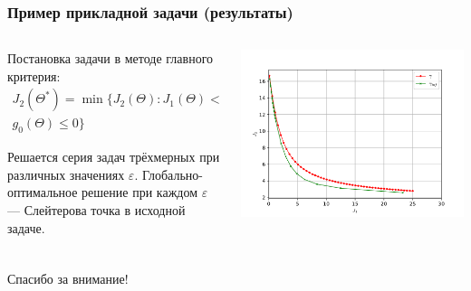 \documentclass[aspectratio=1610]{beamer}
\begin{document}
\begin{frame}
  \frametitle{Пример прикладной задачи (результаты)}
  \begin{columns}
    \begin{column}{0.4\textwidth}

      Постановка задачи в методе главного критерия:
      \begin{align*}
        J_2(\Theta^*)=\min\{J_2(\Theta): J_1(\Theta) < \varepsilon, \\
        g_0(\Theta)\leqslant 0\}
      \end{align*}

      Решается серия задач трёхмерных при различных значениях \(\varepsilon\). Глобально-оптимальное решение
      при каждом \(\varepsilon\) --- Слейтерова точка в исходной задаче.

    \end{column}
    \begin{column}{0.5\textwidth}
      \centerline{\includegraphics[width=1.2\textwidth]{solution.pdf}}
    \end{column}
  \end{columns}

\end{frame}

\begin{frame}{{}}
  \frametitle{ }
  \begin{center}
    \Large{Спасибо за внимание!}
  \end{center}
\end{frame}
\end{document}
